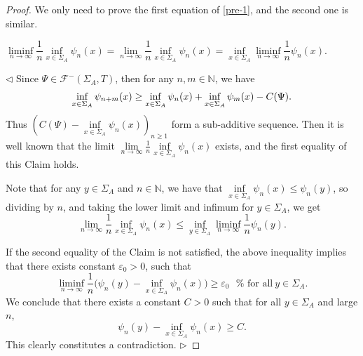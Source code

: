 \documentclass[reqno,11pt,graphicx,]{amsart}
\numberwithin{equation}{section}
\theoremstyle{plain}
\newcommand{\N}{{\mathbb N}}
\newcommand{\3}{\mathbf{3}}
\newcommand{\mw}{x}
\begin{document}
	\begin{proof}
		We only need to prove the first equation of \eqref{pre-1}, and the second one is similar.
		
		  $\liminf\limits_{n\to\infty}\dfrac{1}{n}\inf\limits_{\mw\in\Sigma_A}\psi_{n}(\mw)=\lim\limits_{n\to\infty}\dfrac{1}{n}\inf\limits_{\mw\in\Sigma_A}\psi_{n}(\mw)=\inf\limits_{\mw\in \Sigma_A}\liminf\limits_{n\to\infty}\dfrac{1}{n}\psi_{n}(\mw).$
		
		\noindent $\lhd $
		Since $\Psi\in\mathcal{F}^-(\Sigma_A,T)$, then for any $n,m\in{\mathbb{N}}$, we have 
		\begin{align*}
			\inf_{\mw\in\Sigma_A}\psi_{n+m}(\mw)\geq\inf_{%
				\mw\in\Sigma_A}\psi_{n}(\mw)+\inf_{\mw%
				\in\Sigma_A}\psi_{m}(\mw)-C(\Psi).
		\end{align*}
		Thus $(C(\Psi)-\inf\limits_{\mw\in\Sigma_A}\psi_{n}(%
		\mw))_{n\geq1}$ form a sub-additive sequence. Then it is well
		known that the limit $	\lim\limits_{n\to\infty}\frac{1}{n}\inf\limits_{\mw\in\Sigma_A}\psi_n(\mw)$ exists, and the first equality of this Claim holds.
		
		
		Note that for any $y\in\Sigma_A$ and $n\in\N$, we have that $\inf\limits_{\mw\in\Sigma_A}\psi_n(\mw)\leq\psi_{n}(y)$, so dividing by $n$, and taking the lower limit and infimum for $y\in\Sigma_A$, we get
		\begin{equation*}
			\lim_{n\to\infty}\frac{1}{n}\inf_{\mw\in\Sigma_A}\psi_n(%
			\mw)\leq\inf_{y\in\Sigma_A}\liminf_{n\to\infty}%
			\frac{1}{n}\psi_n(y).
		\end{equation*}
		
		If the second equality of the Claim is not satisfied, the above inequality implies that there exists constant $\varepsilon_0>0$, such that 
		\begin{equation*}
			\liminf_{n\to\infty}\frac{1}{n}\Big(\psi_{n}(y)-\inf_{\mw%
				\in\Sigma_A}\psi_n(\mw)\Big)\geq\varepsilon_0\ \ \ \text{%
				for all}\ y\in\Sigma_A.
		\end{equation*}
		We conclude that there exists a constant $C>0$ such that for all $y
		\in\Sigma_A$ and large $n$, 
		\begin{equation*}
			\psi_{n}(y)-\inf_{\mw\in\Sigma_A}\psi_n(\mw
			)\geq C.
		\end{equation*}
		This clearly constitutes a contradiction.
		\hfill $\rhd$
		

\end{proof}
\end{document}
